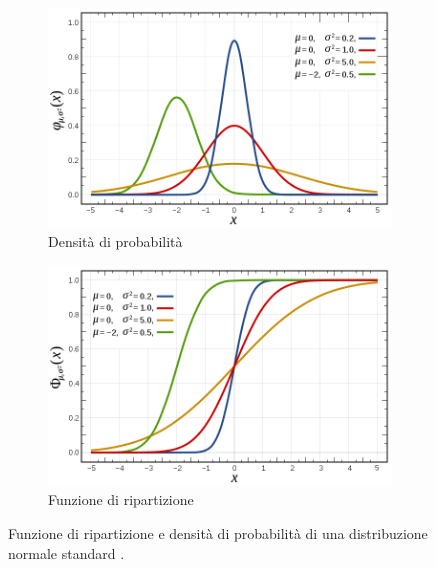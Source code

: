 \begin{figure}[h]
\centering
\begin{subfigure}{.5\textwidth}
  \centering
  \includegraphics[width=\linewidth]{images/Gaussiane/PDFNormalDistribution.png}
  \caption{Densità di probabilità}
  \label{fig:sub1}
\end{subfigure}%
\begin{subfigure}{.5\textwidth}
  \centering
  \includegraphics[width=\linewidth]{images/Gaussiane/CDFNormalDistribution.png}
  \caption{Funzione di ripartizione}
  \label{fig:sub2}
\end{subfigure}
\caption{Funzione di ripartizione e densità di probabilità di una distribuzione normale standard \cite{wikiNormalDistribution}.}
\label{fig:gaussian}
\end{figure}



